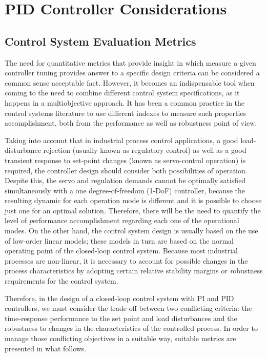 \chapter{PID Controller Considerations}
\label{chap:PIDControllerConsideration}

\section{Control System Evaluation Metrics}

The need for quantitative metrics that provide insight in which measure a given controller tuning provides answer to a specific design criteria can be considered a common sense acceptable fact. However, it becomes an indispensable tool when coming to the need to combine different control system specifications, as it happens in a multiobjective approach.  It has been a common practice in the control systems literature to use different indexes to measure such properties accomplishment, both from the performance as well as robustness point of view.

Taking into account that in industrial process control applications, a good load-disturbance rejection (usually known as regulatory control) as well as a good transient response to set-point changes (known as servo-control operation) is required, the controller design should consider both possibilities of operation. Despite this, the servo and regulation demands cannot be optimally satisfied simultaneously with a one degree-of-freedom (1-DoF) controller, because the resulting dynamic for each operation mode is different and it is possible to choose just one for an optimal solution. Therefore, there will be the need to quantify the level of {\emph performance} accomplishment regarding each one of the operational modes. On the other hand, the control system design is usually based on the use of low-order linear models; these models in turn are based on the normal operating point of the closed-loop control system. Because most industrial processes are non-linear, it is necessary to account for possible changes in the process characteristics by adopting certain relative stability margins or {\emph robustness} requirements for the control system.

Therefore, in the design of a closed-loop control system with PI and PID controllers, we must consider the trade-off between two conflicting criteria: the time-response performance to the set point and load disturbances and the robustness to changes in the characteristics of the controlled process. In order to manage those conflicting objectives in a suitable way, suitable metrics are presented in what follows.
 
